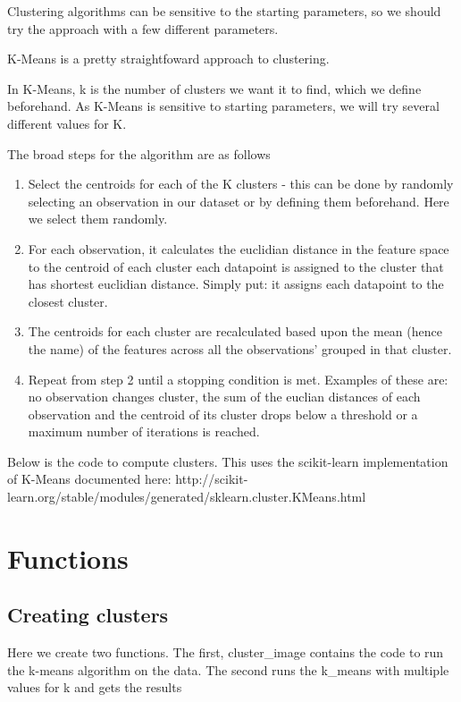 \documentclass[11pt]{article}
\providecommand{\tightlist}{%
      \setlength{\itemsep}{0pt}\setlength{\parskip}{0pt}}
\begin{document}
Clustering algorithms can be sensitive to the starting parameters, so we
should try the approach with a few different parameters.

K-Means is a pretty straightfoward approach to clustering.

In K-Means, k is the number of clusters we want it to find, which we
define beforehand. As K-Means is sensitive to starting parameters, we
will try several different values for K.

The broad steps for the algorithm are as follows

\begin{enumerate}
\def\labelenumi{\arabic{enumi}.}
\tightlist
\item
  Select the centroids for each of the K clusters - this can be done by
  randomly selecting an observation in our dataset or by defining them
  beforehand. Here we select them randomly.
\item
  For each observation, it calculates the euclidian distance in the
  feature space to the centroid of each cluster each datapoint is
  assigned to the cluster that has shortest euclidian distance. Simply
  put: it assigns each datapoint to the closest cluster.
\item
  The centroids for each cluster are recalculated based upon the mean
  (hence the name) of the features across all the observations' grouped
  in that cluster.
\item
  Repeat from step 2 until a stopping condition is met. Examples of
  these are: no observation changes cluster, the sum of the euclian
  distances of each observation and the centroid of its cluster drops
  below a threshold or a maximum number of iterations is reached.
\end{enumerate}

Below is the code to compute clusters. This uses the scikit-learn
implementation of K-Means documented here:
http://scikit-learn.org/stable/modules/generated/sklearn.cluster.KMeans.html

    \section{Functions}\label{functions}

\subsection{Creating clusters}\label{creating-clusters}

Here we create two functions. The first, cluster\_image contains the
code to run the k-means algorithm on the data. The second runs the
k\_means with multiple values for k and gets the results
\end{document}
